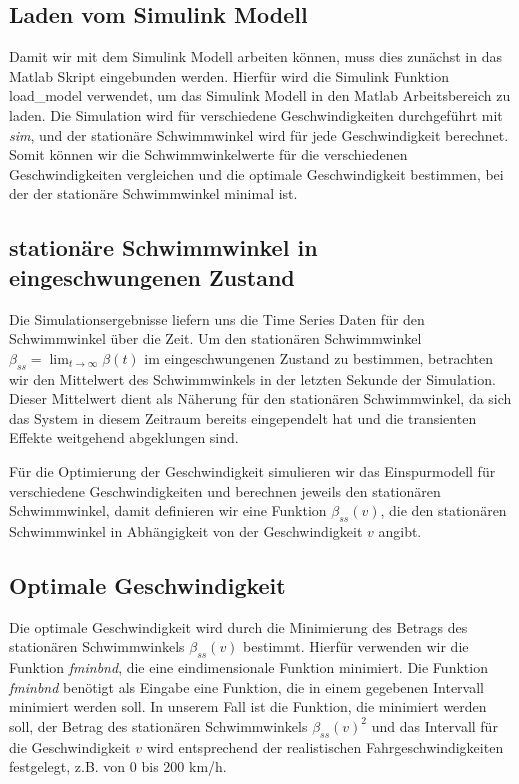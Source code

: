 
\subsection{Laden vom Simulink Modell}

Damit wir mit dem Simulink Modell arbeiten können, muss dies zunächst in das Matlab Skript eingebunden werden. 
Hierfür wird die Simulink Funktion load\_model verwendet, um das Simulink Modell in den Matlab Arbeitsbereich zu laden. 
Die Simulation wird für verschiedene Geschwindigkeiten durchgeführt mit \emph{sim}, und der stationäre Schwimmwinkel wird für jede Geschwindigkeit berechnet.
Somit können wir die Schwimmwinkelwerte für die verschiedenen Geschwindigkeiten vergleichen und die optimale Geschwindigkeit bestimmen, bei der der stationäre Schwimmwinkel minimal ist.

\subsection{stationäre Schwimmwinkel in eingeschwungenen Zustand}
Die Simulationsergebnisse liefern uns die Time Series Daten für den Schwimmwinkel über die Zeit. Um den stationären Schwimmwinkel $\beta_{ss} = \lim_{t \to \infty} \beta(t)$ im eingeschwungenen Zustand zu bestimmen, betrachten
wir den Mittelwert des Schwimmwinkels in der letzten Sekunde der Simulation. Dieser Mittelwert dient als Näherung für den stationären Schwimmwinkel, 
da sich das System in diesem Zeitraum bereits eingependelt hat und die transienten Effekte weitgehend abgeklungen sind.

Für die Optimierung der Geschwindigkeit simulieren wir das Einspurmodell für verschiedene Geschwindigkeiten und berechnen jeweils den stationären Schwimmwinkel, damit definieren wir eine Funktion 
$\beta_{ss}(v)$, die den stationären Schwimmwinkel in Abhängigkeit von der Geschwindigkeit $v$ angibt.

\subsection{Optimale Geschwindigkeit}
Die optimale Geschwindigkeit wird durch die Minimierung des Betrags des stationären Schwimmwinkels $\beta_{ss}(v)$ bestimmt. Hierfür verwenden wir die Funktion \emph{fminbnd}, die eine eindimensionale Funktion minimiert.
Die Funktion \emph{fminbnd} benötigt als Eingabe eine Funktion, die in einem gegebenen Intervall minimiert werden soll. In unserem Fall ist die Funktion, die minimiert werden soll, der Betrag des stationären Schwimmwinkels $\beta_{ss}(v)^2$ 
und das Intervall für die Geschwindigkeit $v$ wird entsprechend der realistischen Fahrgeschwindigkeiten festgelegt, z.B. von 0 bis 200 km/h.

